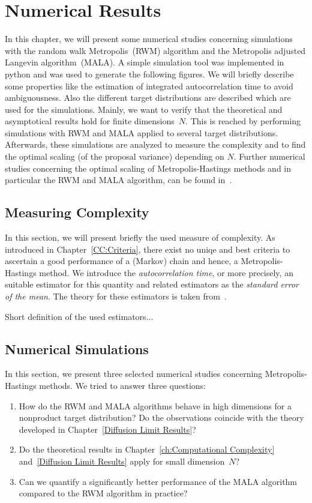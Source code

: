 \chapter{Numerical Results}
\label{Numerical Results}

In this chapter, we will present some numerical studies concerning simulations with the random walk Metropolis~(RWM) algorithm and the Metropolis adjusted Langevin algorithm~(MALA). A simple simulation tool was implemented in python and was used to generate the following figures. We will briefly describe some properties like the estimation of integrated autocorrelation time to avoid ambiguousness. Also the different target distributions are described which are used for the simulations. Mainly, we want to verify that the theoretical and asymptotical results hold for finite dimensions~$N$. This is reached by performing simulations with RWM and MALA applied to several target distributions. Afterwards, these simulations are analyzed to measure the complexity and to find the optimal scaling (of the proposal variance) depending on $N$.
Further numerical studies concerning the optimal scaling of Metropolis-Hastings methods and in particular the RWM and MALA algorithm, can be found in~\autocite{Beskos2008, Gelman1996, Roberts2001}.

\section{Measuring Complexity}
\label{NR- autocorrelation time}

In this section, we will present briefly the used measure of complexity. As introduced in Chapter~\ref{CC:Criteria}, there exist no uniqe and best criteria to ascertain a good performance of a (Markov) chain and hence, a Metropolis-Hastings method. We introduce the \textit{autocorrelation time}, or more precisely, an suitable estimator for this quantity and related estimators as the \textit{standard error of the mean}. The theory for these estimators is taken from~\autocite{Geyer1992}.


Short definition of the used estimators...
\vspace{8cm}


\section{Numerical Simulations}

In this section, we present three selected numerical studies concerning Metropolis-Hastings methods. We tried to answer three questions: 
\begin{enumerate}
 \item How do the RWM and MALA algorithms behave in high dimensions for a nonproduct target distribution? Do the observations coincide with the theory developed in Chapter~\ref{Diffusion Limit Results}?
 \item Do the theoretical results in Chapter~\ref{ch:Computational Complexity} and~\ref{Diffusion Limit Results} apply for small dimension~$N$? 
 \item Can we quantify a significantly better performance of the MALA algorithm compared to the RWM algorithm in practice? 
\end{enumerate}

